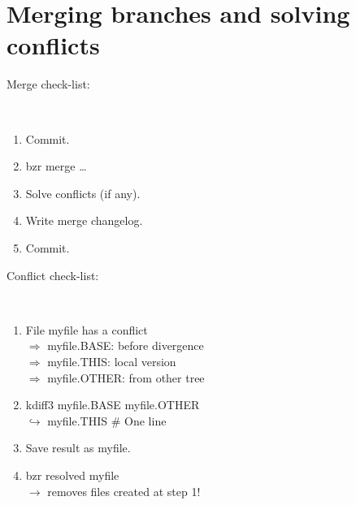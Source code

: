 \documentclass[tumble,foldmark,a4paper]{leaflet}
\begin{document}
\newpage

\section*{Merging branches and solving conflicts}

Merge check-list:
{\tt
\begin{enumerate}
 \item Commit.
 \item bzr merge \ldots
 \item Solve conflicts (if any).
 \item Write merge changelog.
 \item Commit.
\end{enumerate}
}

\begin{center}
\end{center}

\vspace{0.5em}

Conflict check-list:
{\tt
\begin{enumerate}
 \item File myfile has a conflict \\
  $\Longrightarrow$ myfile.BASE: before divergence \\
  $\Longrightarrow$ myfile.THIS: local version \\
  $\Longrightarrow$ myfile.OTHER: from other tree
 \item kdiff3 myfile.BASE myfile.OTHER \\
  $\hookrightarrow$ myfile.THIS \# One line
 \item Save result as myfile.
 \item bzr resolved myfile \\
 $\longrightarrow$ removes files created at step 1!
\end{enumerate}
}

\begin{center}
\end{center}
\end{document}
